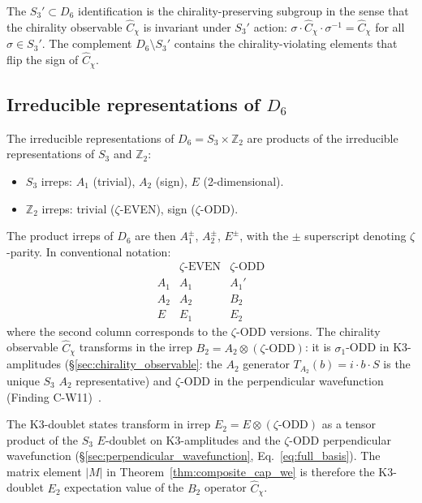 \documentclass[11pt,letterpaper]{article}
\newcommand{\Cchi}{\hat{C}_\chi}
\newcommand{\Dsix}{D_6}
\newcommand{\Sthree}{S_3}
\begin{document}
The $S_3' \subset \Dsix$ identification is the chirality-preserving subgroup in the sense that the chirality observable $\Cchi$ is invariant under $S_3'$ action: $\sigma \cdot \Cchi \cdot \sigma^{-1} = \Cchi$ for all $\sigma \in S_3'$. The complement $\Dsix \setminus S_3'$ contains the chirality-violating elements that flip the sign of $\Cchi$.

\subsection{Irreducible representations of $\Dsix$}\label{sec:d6_irreps}

The irreducible representations of $\Dsix = \Sthree \times \mathbb{Z}_2$ are products of the irreducible representations of $\Sthree$ and $\mathbb{Z}_2$:

\begin{itemize}\setlength\itemsep{0.2em}
    \item $\Sthree$ irreps: $A_1$ (trivial), $A_2$ (sign), $E$ (2-dimensional).
    \item $\mathbb{Z}_2$ irreps: trivial ($\zeta$-EVEN), sign ($\zeta$-ODD).
\end{itemize}

The product irreps of $\Dsix$ are then $A_1^{\pm}$, $A_2^{\pm}$, $E^{\pm}$, with the $\pm$ superscript denoting $\zeta$-parity. In conventional notation:
\[
\begin{array}{c|cc}
& \zeta\text{-EVEN} & \zeta\text{-ODD} \\
\hline
A_1 & A_1 & A_1' \\
A_2 & A_2 & B_2 \\
E & E_1 & E_2
\end{array}
\]
where the second column corresponds to the $\zeta$-ODD versions. The chirality observable $\Cchi$ transforms in the irrep $B_2 = A_2 \otimes (\zeta\text{-ODD})$: it is $\sigma_1$-ODD in K3-amplitudes (\S\ref{sec:chirality_observable}: the $A_2$ generator $T_{A_2}(b) = i \cdot b \cdot S$ is the unique $\Sthree$ $A_2$ representative) and $\zeta$-ODD in the perpendicular wavefunction (Finding C-W11)~\cite{abshier_capotauro_subclaim_c_sketch}.

The K3-doublet states transform in irrep $E_2 = E \otimes (\zeta\text{-ODD})$ as a tensor product of the $\Sthree$ $E$-doublet on K3-amplitudes and the $\zeta$-ODD perpendicular wavefunction (\S\ref{sec:perpendicular_wavefunction}, Eq.~\ref{eq:full_basis}). The matrix element $|M|$ in Theorem~\ref{thm:composite_cap_we} is therefore the K3-doublet $E_2$ expectation value of the $B_2$ operator $\Cchi$.
\end{document}
